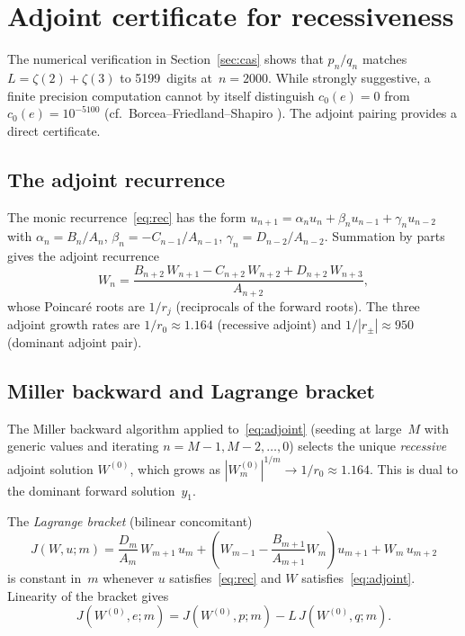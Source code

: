 \documentclass[11pt]{article}
\theoremstyle{remark}
\begin{document}
\section{Adjoint certificate for recessiveness}\label{sec:adjoint}

The numerical verification in Section~\ref{sec:cas} shows
that $p_n/q_n$ matches $L = \zeta(2)+\zeta(3)$ to 5199~digits
at~$n=2000$. While strongly suggestive, a finite precision
computation cannot by itself distinguish $c_0(e) = 0$ from
$c_0(e) = 10^{-5100}$
(cf.~Borcea--Friedland--Shapiro \cite{BFS2011}).
The adjoint pairing provides a direct certificate.

\subsection{The adjoint recurrence}

The monic recurrence~\eqref{eq:rec} has the form
$u_{n+1} = \alpha_n u_n + \beta_n u_{n-1} + \gamma_n u_{n-2}$
with $\alpha_n = B_n/A_n$, $\beta_n = -C_{n-1}/A_{n-1}$,
$\gamma_n = D_{n-2}/A_{n-2}$. Summation by parts gives the
adjoint recurrence
\begin{equation}\label{eq:adjoint}
W_n = \frac{B_{n+2}\,W_{n+1} - C_{n+2}\,W_{n+2}
+ D_{n+2}\,W_{n+3}}{A_{n+2}},
\end{equation}
whose Poincar\'e roots are $1/r_j$ (reciprocals of the forward
roots). The three adjoint growth rates are
$1/r_0 \approx 1.164$ (recessive adjoint) and
$1/|r_\pm| \approx 950$ (dominant adjoint pair).

\subsection{Miller backward and Lagrange bracket}

The Miller backward algorithm applied to~\eqref{eq:adjoint}
(seeding at large~$M$ with generic values and iterating
$n = M{-}1, M{-}2, \ldots, 0$) selects the unique
\emph{recessive} adjoint solution $W^{(0)}$, which grows as
$|W^{(0)}_m|^{1/m} \to 1/r_0 \approx 1.164$. This is dual to
the dominant forward solution~$y_1$.

The \emph{Lagrange bracket} (bilinear concomitant)
\begin{equation}\label{eq:bracket}
J(W,u;m) = \frac{D_m}{A_m}\,W_{m+1}\,u_m
+ \left(W_{m-1} - \frac{B_{m+1}}{A_{m+1}}W_m\right)u_{m+1}
+ W_m\,u_{m+2}
\end{equation}
is constant in~$m$ whenever $u$ satisfies~\eqref{eq:rec} and
$W$ satisfies~\eqref{eq:adjoint}. Linearity of the bracket
gives
\[
J(W^{(0)}, e; m) = J(W^{(0)}, p; m) - L\,J(W^{(0)}, q; m).
\]
\end{document}
